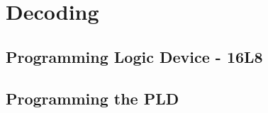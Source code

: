 \section{Decoding}

    \subsection{Programming Logic Device - 16L8}

    \subsection{Programming the PLD}
